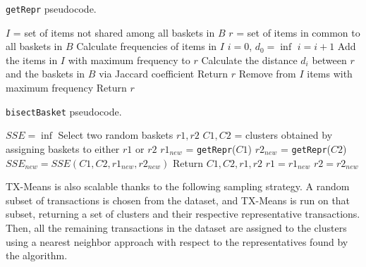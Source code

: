 \begin{algorithm}[H]
\caption{\texttt{getRepr} pseudocode.}
\begin{algorithmic}[1]
    \State $I$ = set of items not shared among all baskets in $B$
    \State $r$ = set of items in common to all baskets in $B$
    \State Calculate frequencies of items in $I$
    \State $i = 0$, $d_0 = \inf$
        \State $i = i + 1$
        \State Add the items in $I$ with maximum frequency to $r$
        \State Calculate the distance $d_i$ between $r$ and the baskets in $B$ via Jaccard coefficient
            \State Return $r$
        \Else
            \State Remove from $I$ items with maximum frequency
        \EndIf
    \EndWhile 
    \State Return $r$
\end{algorithmic}

\end{algorithm}
\begin{algorithm}
\caption{\texttt{bisectBasket} pseudocode.}
\begin{algorithmic}[1]
    \State $\textit{SSE} = \inf$
    \State Select two random baskets $r1,r2$
        \State $C1,C2$ = clusters obtained by assigning baskets to either $r1$ or $r2$
        \State $r1_{new}$ = \texttt{getRepr}($C1$)
        \State $r2_{new}$ = \texttt{getRepr}($C2$)
        \State $\textit{SSE}_{new} = \textit{SSE}(C1,C2,r1_{new},r2_{new})$
            \State Return $C1,C2,r1,r2$
        \EndIf
        \State $r1 = r1_{new}$
        \State $r2 = r2_{new}$
    \EndWhile
\end{algorithmic}
\end{algorithm}
TX-Means is also scalable thanks to the following sampling strategy. A random subset of transactions is chosen from the dataset, and TX-Means is run on that subset, returning a set of clusters and their respective representative transactions. Then, all the remaining transactions in the dataset are assigned to the clusters using a nearest neighbor approach with respect to the representatives found by the algorithm.